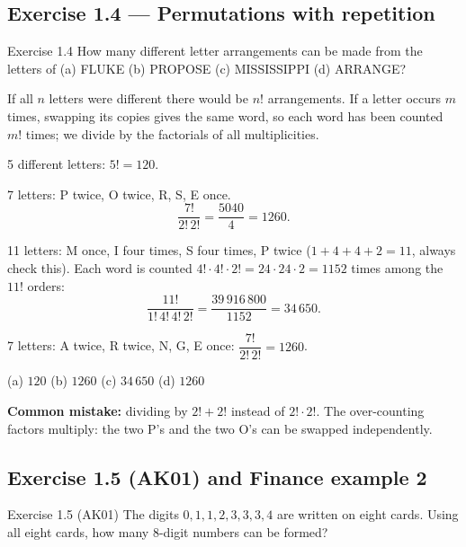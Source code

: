\subsection{Exercise 1.4 --- Permutations with repetition}

\begin{task}{Exercise 1.4}
	How many different letter arrangements can be made from the letters of
	(a) \mbox{FLUKE} \quad (b) \mbox{PROPOSE} \quad (c) \mbox{MISSISSIPPI} \quad (d) \mbox{ARRANGE}?
\end{task}
\workspace{3cm}

\ifsolutions
	\soltitle
	\idea If all $n$ letters were different there would be $n!$ arrangements.
	If a letter occurs $m$ times, swapping its copies gives the same word, so
	each word has been counted $m!$ times; we divide by the factorials of all
	multiplicities.

	 5 different letters: $5! = 120$.

	 7 letters: P twice, O twice, R, S, E once.
	\[ \frac{7!}{2!\,2!} = \frac{5040}{4} = 1260. \]

	 11 letters: M once, I four times, S four times,
	P twice ($1+4+4+2=11$, always check this). Each word is counted
	$4!\cdot4!\cdot2! = 24\cdot24\cdot2 = 1152$ times among the $11!$ orders:
	\[ \frac{11!}{1!\,4!\,4!\,2!} = \frac{39\,916\,800}{1152} = 34\,650. \]

	 7 letters: A twice, R twice, N, G, E once:
	$\dfrac{7!}{2!\,2!}=1260$.

	\begin{answer}
		(a) $120$ \quad (b) $1260$ \quad (c) $34\,650$ \quad (d) $1260$
	\end{answer}

	\begin{remark}
		\textbf{Common mistake:} dividing by $2!+2!$ instead of $2!\cdot2!$. The
		over-counting factors multiply: the two P's and the two O's can be swapped
		independently.
	\end{remark}
\fi

\subsection{Exercise 1.5 (AK01) and Finance example 2}

\begin{task}{Exercise 1.5 (AK01)}
	The digits $0,1,1,2,3,3,3,4$ are written on eight cards. Using all eight
	cards, how many 8-digit numbers can be formed?
\end{task}
\workspace{3cm}

